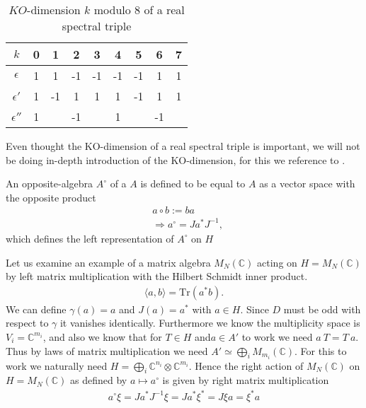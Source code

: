 \begin{table}[h!]
    \centering
    \caption{$KO$-dimension $k$ modulo $8$ of a real spectral triple}
    \begin{tabular}{ c | c c c c c c c c}
        \hline
        $k$        & 0 & 1 & 2 & 3 & 4 & 5 & 6 & 7 \\
        \hline
     $\epsilon$    & 1 & 1 & -1 & -1 & -1 & -1 & 1 & 1 \\
     $\epsilon '$  & 1 & -1 & 1 & 1 & 1 & -1 & 1 & 1 \\
     $\epsilon ''$ & 1 &  & -1 &  & 1 &  & -1 &  \\
     \hline
    \end{tabular}
\end{table}
\noindent
Even thought the KO-dimension of a real spectral triple is important, we will
not be doing in-depth introduction of the KO-dimension, for this we reference
to \cite{ncgwalter}.

\begin{definition}
An opposite-algebra $A^\circ$ of a $A$ is defined to be equal to $A$ as a
vector space with the opposite product
\begin{align}
    &a\circ b := ba\\
    &\Rightarrow a^\circ = Ja^* J^{-1},
\end{align}
which defines the left representation of $A^\circ$ on $H$
\end{definition}


Let us examine an example of a matrix algebra $M_N(\mathbb{C})$ acting on
$H=M_N(\mathbb{C})$ by left matrix multiplication with the Hilbert Schmidt
inner product.
\begin{align}
    \langle a , b \rangle = \text{Tr}(a^* b).
\end{align}
We can define $\gamma (a) = a$ and $J(a) = a^*$ with $a\in H$.  Since $D$
must be odd with respect to $\gamma$ it vanishes identically.  Furthermore we
know the multiplicity space is $V_i = \mathbb{C}^{m_i}$, and also we know
that for $T\in H$ and$a\in A'$ to work we need $a\ T=T\ a$. Thus by laws of
matrix multiplication we need $A' \simeq \bigoplus _i M_{m_i}(\mathbb{C})$. For
this to work we naturally need $H = \bigoplus_i \mathbb{C}^{n_i} \otimes
\mathbb{C}^{m_i}$.  Hence the right action of $M_N(\mathbb{C})$ on $H =
M_N(\mathbb{C})$ as defined by $a \mapsto a^\circ$ is given by right matrix
multiplication
\begin{align}
    a^\circ \xi = J a^* J^{-1}\xi = Ja^* \xi^* = J\xi a=\xi^* a
\end{align}

